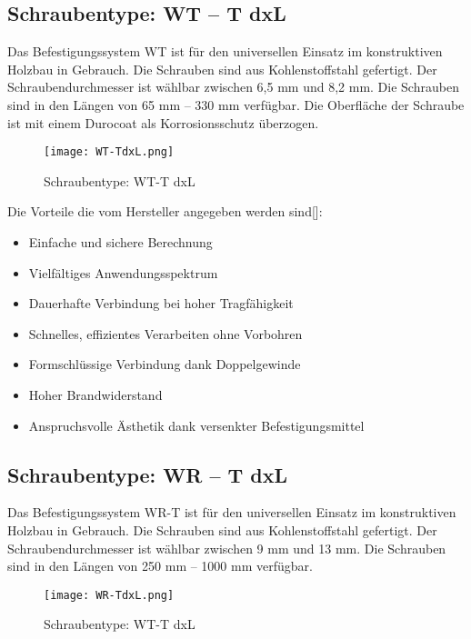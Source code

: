 \documentclass[12 pt,a4 paper ]{scrreprt}
\begin{document}
\subsection{Schraubentype: WT – T dxL }
Das Befestigungssystem WT ist für den universellen Einsatz im konstruktiven Holzbau in Gebrauch. Die Schrauben sind aus Kohlenstoffstahl gefertigt. Der Schraubendurchmesser ist wählbar zwischen 6,5 mm und 8,2 mm. Die Schrauben sind in den Längen von  65 mm – 330 mm verfügbar. Die Oberfläche der Schraube ist mit einem Durocoat als Korrosionsschutz überzogen.

\begin{figure}[h]
\begin{center}
\texttt{[image: WT-TdxL.png]}
\caption{Schraubentype: WT-T dxL}
\end{center}
\end{figure}

Die Vorteile die vom Hersteller angegeben werden sind[]:

\begin{itemize}
	\item Einfache und sichere Berechnung
	\item Vielfältiges Anwendungsspektrum
	\item Dauerhafte Verbindung  bei hoher Tragfähigkeit
	\item Schnelles, effizientes Verarbeiten ohne Vorbohren
	\item Formschlüssige Verbindung  dank Doppelgewinde
	\item Hoher Brandwiderstand
	\item Anspruchsvolle Ästhetik dank versenkter Befestigungsmittel
	
\end{itemize}

\subsection{Schraubentype:	 WR – T  dxL}
Das Befestigungssystem WR-T ist für den universellen Einsatz im konstruktiven Holzbau in Gebrauch. Die Schrauben sind aus Kohlenstoffstahl gefertigt. Der Schraubendurchmesser ist wählbar zwischen 9 mm und 13 mm. Die Schrauben sind in den Längen von  250 mm – 1000 mm verfügbar. 

\begin{figure}[h]
\begin{center}
\texttt{[image: WR-TdxL.png]}
\caption{Schraubentype: WT-T dxL}
\end{center}
\end{figure}
\end{document}
